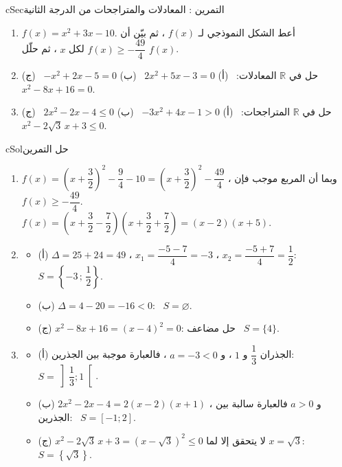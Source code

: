 \documentclass[12pt,a4paper]{article}
\newenvironment{BOX}[2]{\begin{otherlanguage}{english}\begin{arbox}{#1}{#2}}{\end{arbox}\end{otherlanguage}}
\newcounter{exo}
\newenvironment{tamrin}[1]{\stepcounter{exo}\begin{BOX}{cSec}{التمرين \theexo: #1}}{\end{BOX}}
\newenvironment{hal}{\Needspace{12\baselineskip}\begin{otherlanguage}{english}\begin{arbox}[breakable]{cSol}{حل التمرين \theexo}}{\end{arbox}\end{otherlanguage}}
\newcommand{\R}{\mathbb{R}}
\begin{document}
\begin{tamrin}{المعادلات والمتراجحات من الدرجة الثانية}
\begin{enumerate}
\item $f(x)=x^2+3x-10$. أعط الشكل النموذجي لـ $f(x)$ ، ثم بيّن أن $f(x)\ge-\dfrac{49}{4}$ لكل $x$ ، ثم حلّل $f(x)$.
\item حل في $\R$ المعادلات: \ (أ) $2x^2+5x-3=0$ \ (ب) $-x^2+2x-5=0$ \ (ج) $x^2-8x+16=0$.
\item حل في $\R$ المتراجحات: \ (أ) $-3x^2+4x-1>0$ \ (ب) $2x^2-2x-4\le0$ \ (ج) $x^2-2\sqrt3\,x+3\le0$.
\end{enumerate}
\end{tamrin}
\begin{hal}
\begin{enumerate}
\item $f(x)=\left(x+\dfrac32\right)^2-\dfrac94-10=\boxed{\left(x+\dfrac32\right)^2-\dfrac{49}{4}}$ ، وبما أن المربع موجب فإن $f(x)\ge-\dfrac{49}4$.\\
$f(x)=\left(x+\dfrac32-\dfrac72\right)\left(x+\dfrac32+\dfrac72\right)=\boxed{(x-2)(x+5)}$.
\item \begin{itemize}
\item (أ) $\Delta=25+24=49$ ، $x_1=\dfrac{-5-7}{4}=-3$ ، $x_2=\dfrac{-5+7}{4}=\dfrac12$: \ $S=\left\{-3\,;\,\dfrac12\right\}$.
\item (ب) $\Delta=4-20=-16<0$: \ $S=\varnothing$.
\item (ج) $x^2-8x+16=(x-4)^2=0$: حل مضاعف \ $S=\{4\}$.
\end{itemize}
\item \begin{itemize}
\item (أ) الجذران $\dfrac13$ و $1$ ، و $a=-3<0$ ، فالعبارة موجبة بين الجذرين: \ $S=\left]\dfrac13;1\right[$.
\item (ب) $2x^2-2x-4=2(x-2)(x+1)$ ، و $a>0$ فالعبارة سالبة بين الجذرين: \ $S=[-1;2]$.
\item (ج) $x^2-2\sqrt3\,x+3=\left(x-\sqrt3\right)^2\le0$ لا يتحقق إلا لما $x=\sqrt3$: \ $S=\left\{\sqrt3\right\}$.
\end{itemize}
\end{enumerate}
\end{hal}
\end{document}
